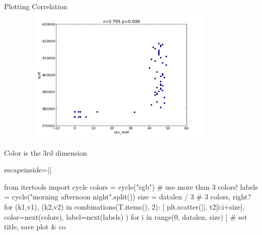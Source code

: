 \documentclass{beamer}[10]
\begin{document}
\begin{pyframe}{Plotting Correlation}
\includegraphics[height=6.6cm,width=12cm]{monochromo_cpu_wait_buff.pdf}
\end{pyframe}

\begin{pyframe}{Color is the 3rd dimension}
\begin{pycode*}{escapeinside=||}

from itertools import cycle
colors = cycle("rgb")   # use more than 3 colors!
labels = cycle("morning afternoon night".split())
size = datalen / 3      # 3 colors, right?
for (k1,v1), (k2,v2) in combinations(T.items(), 2):  
  [    plt.scatter(||, t2[i:i+size], 
        color=next(colors), 
        label=next(labels)
        ) for i in range(0, datalen, size) ]
  # set title, save plot & co

   
\end{pycode*}
\end{pyframe}

\end{document}
